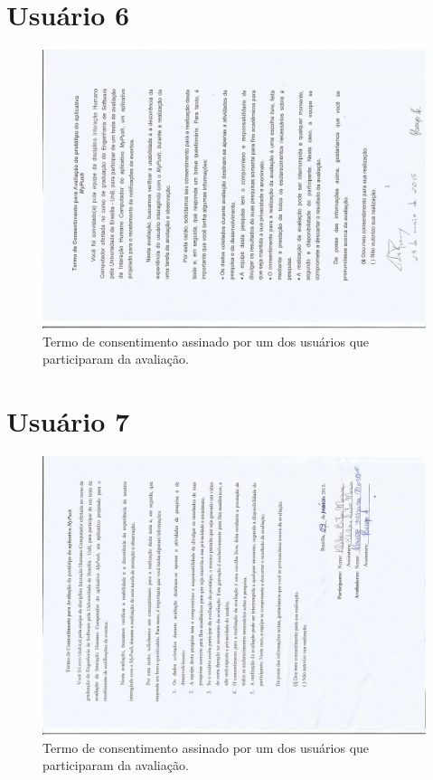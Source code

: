 \begin{anexosenv}
      \section*{Usuário 6}
    \begin{figure}[!htbp]
      \centering
      \includegraphics[scale=0.6, angle=-90]{editaveis/figuras/lidia}
      \caption{Termo de consentimento assinado por um dos usuários que participaram da avaliação.}
      \label{termo_consentimento_1}
    \end{figure}
    \pagebreak
    
      \section*{Usuário 7}
    \begin{figure}[!htbp]
      \centering
      \includegraphics[scale=0.6, angle=-90]{editaveis/figuras/kleber}
      \caption{Termo de consentimento assinado por um dos usuários que participaram da avaliação.}
      \label{termo_consentimento_1}
    \end{figure}
    \pagebreak
    

\end{anexosenv}
